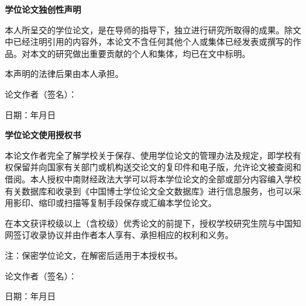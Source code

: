 \begin{creative}
\vspace{1cm}
\begin{center}
{\xiaoer \songti \bfseries 学位论文独创性声明}
\end{center}


本人所呈交的学位论文，是在导师的指导下，独立进行研究所取得的成果。除文
中已经注明引用的内容外，本论文不含任何其他个人或集体已经发表或撰写的作
品。对本文的研究做出重要贡献的个人和集体，均已在文中标明。

本声明的法律后果由本人承担。
\vspace{1cm}

\hspace{20em}论文作者（签名）：     

\hspace{20em}日期：\hspace{2em}年\hspace{2em}月\hspace{2em}日
\vspace{2cm}

\begin{center}
{\xiaoer \songti \bfseries 学位论文使用授权书}
\end{center}


本论文作者完全了解学校关于保存、使用学位论文的管理办法及规定，即学校有
权保留并向国家有关部门或机构送交论文的复印件和电子版，允许论文被查阅和
借阅。本人授权中南财经政法大学可以将本学位论文的全部或部分内容编入学校
有关数据库和收录到《中国博士学位论文全文数据库》进行信息服务，也可以采
用影印、缩印或扫描等复制手段保存或汇编本学位论文。

在本文获评校级以上（含校级）优秀论文的前提下，授权学校研究生院与中国知
网签订收录协议并由作者本人享有、承担相应的权利和义务。

注：保密学位论文，在解密后适用于本授权书。

\vspace{1cm}
\hspace{20em}论文作者（签名）：

\hspace{20em}日期：\hspace{2em}年\hspace{2em}月\hspace{2em}日

\end{creative}